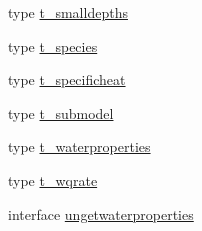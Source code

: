 \begin{DoxyCompactItemize}
type \mbox{\hyperlink{structmodulewaterproperties_1_1t__smalldepths}{t\+\_\+smalldepths}}
\item 
type \mbox{\hyperlink{structmodulewaterproperties_1_1t__species}{t\+\_\+species}}
\item 
type \mbox{\hyperlink{structmodulewaterproperties_1_1t__specificheat}{t\+\_\+specificheat}}
\item 
type \mbox{\hyperlink{structmodulewaterproperties_1_1t__submodel}{t\+\_\+submodel}}
\item 
type \mbox{\hyperlink{structmodulewaterproperties_1_1t__waterproperties}{t\+\_\+waterproperties}}
\item 
type \mbox{\hyperlink{structmodulewaterproperties_1_1t__wqrate}{t\+\_\+wqrate}}
\item 
interface \mbox{\hyperlink{interfacemodulewaterproperties_1_1ungetwaterproperties}{ungetwaterproperties}}
\end{DoxyCompactItemize}
